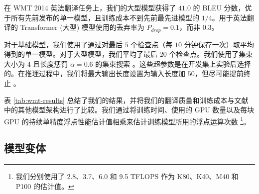 在 WMT 2014 英法翻译任务上，我们的大型模型获得了 $41.0$ 的 BLEU 分数，优于所有先前发布的单一模型，且训练成本不到先前最先进模型的 $1/4$。用于英法翻译的 Transformer (大型) 模型使用的丢弃率为 $P_{drop}=0.1$，而非 $0.3$。

对于基础模型，我们使用了通过对最后 $5$ 个检查点（每 $10$ 分钟保存一次）取平均得到的单一模型。对于大型模型，我们平均了最后 $20$ 个检查点。我们使用了集束大小为 $4$ 且长度惩罚 $\alpha=0.6$ 的集束搜索 \citep{wu2016google}。这些超参数是在开发集上实验后选择的。在推理过程中，我们将最大输出长度设置为输入长度加 $50$，但尽可能提前终止 \citep{wu2016google}。

表 \ref{tab:wmt-results} 总结了我们的结果，并将我们的翻译质量和训练成本与文献中的其他模型架构进行了比较。我们通过将训练时间、使用的 GPU 数量以及每块 GPU 的持续单精度浮点性能估计值相乘来估计训练模型所用的浮点运算次数 \footnote{我们分别使用了 2.8、3.7、6.0 和 9.5 TFLOPS 作为 K80、K40、M40 和 P100 的估计值。}。

\subsection{模型变体}

